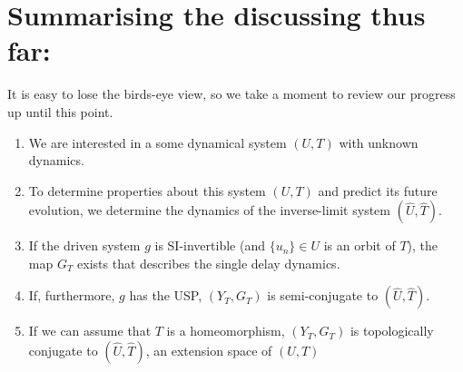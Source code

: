 \documentclass[a4paper,12pt,twoside]{report}
\newtheorem{Theorem}{Theorem}[]
\begin{document}


 



\section*{Summarising the discussing thus far:}

It is easy to lose the birds-eye view, so we take a moment to review our progress up until this point.

\vspace{-8mm}
\begin{enumerate}
\item We are interested in a some dynamical system $(U,T)$ with unknown dynamics.
\item To determine properties about this system $(U,T)$ and predict its future evolution, we determine the dynamics of the inverse-limit system $(\widehat{U}, \widehat{T})$.
\item If the driven system $g$ is SI-invertible (and $\{u_n\}\in{U}$  is an orbit of $T$), the map $G_T$ exists that describes the single delay dynamics. 
\item If, furthermore, $g$ has the USP, $(Y_T, G_T)$ is semi-conjugate to $(\widehat{U}, \widehat{T})$.
\item If we can assume that $T$ is a homeomorphism, $(Y_T, G_T)$ is topologically conjugate to $(\widehat{U}, \widehat{T})$, an extension space of $(U,T)$
\end{enumerate} 
\end{document}
